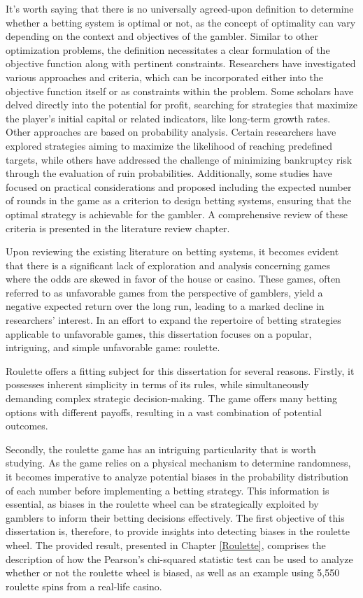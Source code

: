 \documentclass[11pt,twoside]{article}
\numberwithin{Theorem}{section}
\numberwithin{Definition}{section}
\numberwithin{Lemma}{section}
\numberwithin{Algorithm}{section}
\numberwithin{equation}{section}
\begin{document}
It's worth saying that there is no universally agreed-upon definition to determine whether a betting system is optimal or not, as the concept of optimality can vary depending on the context and objectives of the gambler. Similar to other optimization problems, the definition necessitates a clear formulation of the objective function along with pertinent constraints. Researchers have investigated various approaches and criteria, which can be incorporated either into the objective function itself or as constraints within the problem. Some scholars have delved directly into the potential for profit, searching for strategies that maximize the player's initial capital\cite{Thorp} or related indicators, like long-term growth rates\cite{Kelly}. Other approaches are based on probability analysis. Certain researchers have explored strategies aiming to maximize the likelihood of reaching predefined targets\cite{Breiman_1961, Dubins, Ross_1974}, while others have addressed the challenge of minimizing bankruptcy risk through the evaluation of ruin probabilities\cite{Thorp}. Additionally, some studies have focused on practical considerations and proposed including the expected number of rounds in the game as a criterion to design betting systems\cite{Breiman_1961}, ensuring that the optimal strategy is achievable for the gambler. A comprehensive review of these criteria is presented in the literature review chapter.

Upon reviewing the existing literature on betting systems, it becomes evident that there is a significant lack of exploration and analysis concerning games where the odds are skewed in favor of the house or casino. These games, often referred to as unfavorable games from the perspective of gamblers, yield a negative expected return over the long run, leading to a marked decline in researchers' interest. In an effort to expand the repertoire of betting strategies applicable to unfavorable games, this dissertation focuses on a popular, intriguing, and simple unfavorable game: roulette.

Roulette offers a fitting subject for this dissertation for several reasons. Firstly, it possesses inherent simplicity in terms of its rules, while simultaneously demanding complex strategic decision-making. The game offers many betting options with different payoffs, resulting in a vast combination of potential outcomes.

Secondly, the roulette game has an intriguing particularity that is worth studying. As the game relies on a physical mechanism to determine randomness, it becomes imperative to analyze potential biases in the probability distribution of each number before implementing a betting strategy. This information is essential, as biases in the roulette wheel can be strategically exploited by gamblers to inform their betting decisions effectively. The first objective of this dissertation is, therefore, to provide insights into detecting biases in the roulette wheel. The provided result, presented in Chapter \ref{Roulette}, comprises the description of how the Pearson's chi-squared statistic test can be used to analyze whether or not the roulette wheel is biased, as well as an example using 5,550 roulette spins from a real-life casino.
\end{document}
